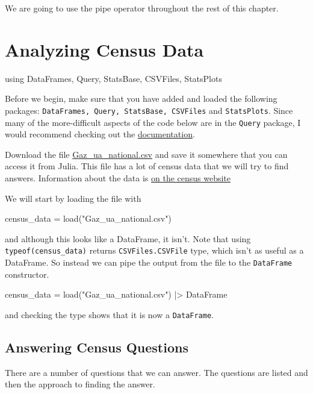We are going to use the pipe operator throughout the rest of this chapter.

\section{Analyzing Census Data} 
\begin{jlblock}[census]
using DataFrames, Query, StatsBase, CSVFiles, StatsPlots
\end{jlblock}

Before we begin, make sure that you have added and loaded the following packages: \texttt{\small DataFrames, Query, StatsBase, CSVFiles} and \texttt{\small StatsPlots}.  Since many of the more-diff\-i\-cult aspects of the code below are in the \texttt{Query} package, I would recommend checking out the \href{http://www.queryverse.org/Query.jl/stable/}{documentation}. 

Download the file \href{other/Gaz_ua_national.csv}{Gaz\_ua\_national.csv} and save it somewhere that you can access it from Julia. This file has a lot of census data that we will try to find answers. Information about the data is \href{http://www.census.gov/geo/maps-data/data/gazetteer2010.html}{on the census website}

We will start by loading the file with
%
\begin{jlblock}[census]
census_data = load("Gaz_ua_national.csv")
\end{jlblock}
%
and although this looks like a DataFrame, it isn't. Note that using \texttt{typeof(census\_data)} returns \texttt{CSVFiles.CSVFile} type, which isn't as useful as a DataFrame. So instead we can pipe the output from the file to the \texttt{DataFrame} constructor.  
%
\begin{jlblock}[census]
census_data = load("Gaz_ua_national.csv") |> DataFrame
\end{jlblock}
%
and checking the type shows that it is now a \texttt{DataFrame}.

\subsection{Answering Census Questions}

There are a number of questions that we can answer.  The questions are listed and then the approach to finding the answer.  


